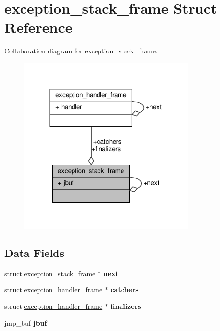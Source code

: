 \hypertarget{structexception__stack__frame}{}\section{exception\+\_\+stack\+\_\+frame Struct Reference}
\label{structexception__stack__frame}


Collaboration diagram for exception\+\_\+stack\+\_\+frame\+:\nopagebreak
\begin{figure}[H]
\begin{center}
\leavevmode
\includegraphics[width=251pt]{structexception__stack__frame__coll__graph}
\end{center}
\end{figure}
\subsection*{Data Fields}
\begin{DoxyCompactItemize}
\item 
struct \hyperlink{structexception__stack__frame}{exception\+\_\+stack\+\_\+frame} $\ast$ {\bfseries next}\hypertarget{structexception__stack__frame_abb538d9a6f6155ed83f140dd2adb7457}{}\label{structexception__stack__frame_abb538d9a6f6155ed83f140dd2adb7457}

\item 
struct \hyperlink{structexception__handler__frame}{exception\+\_\+handler\+\_\+frame} $\ast$ {\bfseries catchers}\hypertarget{structexception__stack__frame_a950ab78cc930f9662ff9cb7eedcfda79}{}\label{structexception__stack__frame_a950ab78cc930f9662ff9cb7eedcfda79}

\item 
struct \hyperlink{structexception__handler__frame}{exception\+\_\+handler\+\_\+frame} $\ast$ {\bfseries finalizers}\hypertarget{structexception__stack__frame_a543e62e78b4b2777e9df32ccc5feba38}{}\label{structexception__stack__frame_a543e62e78b4b2777e9df32ccc5feba38}

\item 
jmp\+\_\+buf {\bfseries jbuf}\hypertarget{structexception__stack__frame_a6f81386a697bcae78000625ee8ba02fa}{}\label{structexception__stack__frame_a6f81386a697bcae78000625ee8ba02fa}

\end{DoxyCompactItemize}


